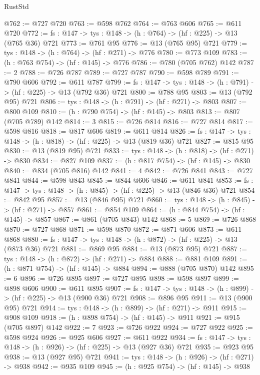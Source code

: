 \begin{lexlean}{RustStd}
\begin{coremodule}
@762 := @727 @720
@763 := @598 @762
@764 := @763 @606
@765 := @611 @720
@772 := {fs : @147} -> {tys : @148} -> (h : @764) -> (hf : @225) -> @13 (@765 @36) @721
@773 := @761 @95
@776 := @13 (@765 @95) @721
@779 := {tys : @148} -> (h : @764) -> (hf : @271) -> @776
@780 := @773 @109
@783 := (h : @763 @754) -> (hf : @145) -> @776
@786 := @780 (@705 @762) @142
@787 := 2
@788 := @726 @787
@789 := @727 @787
@790 := @598 @789
@791 := @790 @606
@792 := @611 @787
@799 := {fs : @147} -> {tys : @148} -> (h : @791) -> (hf : @225) -> @13 (@792 @36) @721
@800 := @788 @95
@803 := @13 (@792 @95) @721
@806 := {tys : @148} -> (h : @791) -> (hf : @271) -> @803
@807 := @800 @109
@810 := (h : @790 @754) -> (hf : @145) -> @803
@813 := @807 (@705 @789) @142
@814 := 3
@815 := @726 @814
@816 := @727 @814
@817 := @598 @816
@818 := @817 @606
@819 := @611 @814
@826 := {fs : @147} -> {tys : @148} -> (h : @818) -> (hf : @225) -> @13 (@819 @36) @721
@827 := @815 @95
@830 := @13 (@819 @95) @721
@833 := {tys : @148} -> (h : @818) -> (hf : @271) -> @830
@834 := @827 @109
@837 := (h : @817 @754) -> (hf : @145) -> @830
@840 := @834 (@705 @816) @142
@841 := 4
@842 := @726 @841
@843 := @727 @841
@844 := @598 @843
@845 := @844 @606
@846 := @611 @841
@853 := {fs : @147} -> {tys : @148} -> (h : @845) -> (hf : @225) -> @13 (@846 @36) @721
@854 := @842 @95
@857 := @13 (@846 @95) @721
@860 := {tys : @148} -> (h : @845) -> (hf : @271) -> @857
@861 := @854 @109
@864 := (h : @844 @754) -> (hf : @145) -> @857
@867 := @861 (@705 @843) @142
@868 := 5
@869 := @726 @868
@870 := @727 @868
@871 := @598 @870
@872 := @871 @606
@873 := @611 @868
@880 := {fs : @147} -> {tys : @148} -> (h : @872) -> (hf : @225) -> @13 (@873 @36) @721
@881 := @869 @95
@884 := @13 (@873 @95) @721
@887 := {tys : @148} -> (h : @872) -> (hf : @271) -> @884
@888 := @881 @109
@891 := (h : @871 @754) -> (hf : @145) -> @884
@894 := @888 (@705 @870) @142
@895 := 6
@896 := @726 @895
@897 := @727 @895
@898 := @598 @897
@899 := @898 @606
@900 := @611 @895
@907 := {fs : @147} -> {tys : @148} -> (h : @899) -> (hf : @225) -> @13 (@900 @36) @721
@908 := @896 @95
@911 := @13 (@900 @95) @721
@914 := {tys : @148} -> (h : @899) -> (hf : @271) -> @911
@915 := @908 @109
@918 := (h : @898 @754) -> (hf : @145) -> @911
@921 := @915 (@705 @897) @142
@922 := 7
@923 := @726 @922
@924 := @727 @922
@925 := @598 @924
@926 := @925 @606
@927 := @611 @922
@934 := {fs : @147} -> {tys : @148} -> (h : @926) -> (hf : @225) -> @13 (@927 @36) @721
@935 := @923 @95
@938 := @13 (@927 @95) @721
@941 := {tys : @148} -> (h : @926) -> (hf : @271) -> @938
@942 := @935 @109
@945 := (h : @925 @754) -> (hf : @145) -> @938

\end{coremodule}
\end{lexlean}
